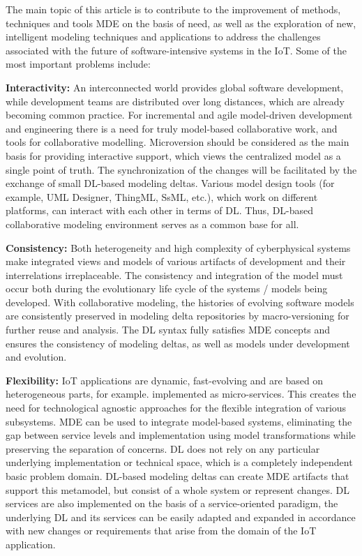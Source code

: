 The main topic of this article is to contribute to the improvement of methods, techniques and tools MDE on the basis of need, as well as the exploration of new, intelligent modeling techniques and applications to address the challenges associated with the future of software-intensive systems in the IoT. Some of the most important problems include:

\textbf{Interactivity:} An interconnected world provides global software development, while development teams are distributed over long distances, which are already becoming common practice. For incremental and agile model-driven development and engineering there is a need for truly model-based collaborative work, and tools for collaborative modelling. Microversion should be considered as the main basis for providing interactive support, which views the centralized model as a single point of truth. The synchronization of the changes will be facilitated by the exchange of small DL-based modeling deltas. Various model design tools (for example, UML Designer, ThingML, SsML, etc.), which work on different platforms, can interact with each other in terms of DL. Thus, DL-based collaborative modeling environment serves as a common base for all. 

\textbf{Consistency:} Both heterogeneity and high complexity of cyberphysical systems make integrated views and models of various artifacts of development and their interrelations irreplaceable. The consistency and integration of the model must occur both during the evolutionary life cycle of the systems / models being developed. With collaborative modeling, the histories of evolving software models are consistently preserved in modeling delta repositories by macro-versioning for further reuse and analysis. The DL syntax fully satisfies MDE concepts and ensures the consistency of modeling deltas, as well as models under development and evolution.

\textbf{Flexibility:} IoT applications are dynamic, fast-evolving and are based on heterogeneous parts, for example. implemented as micro-services. This creates the need for technological agnostic approaches for the flexible integration of various subsystems. MDE can be used to integrate model-based systems, eliminating the gap between service levels and implementation using model transformations while preserving the separation of concerns. DL does not rely on any particular underlying implementation or technical space, which is a completely independent basic problem domain. DL-based modeling deltas can create MDE artifacts that support this metamodel, but consist of a whole system or represent changes. DL services are also implemented on the basis of a service-oriented paradigm, the underlying DL and its services can be easily adapted and expanded in accordance with new changes or requirements that arise from the domain of the IoT application.